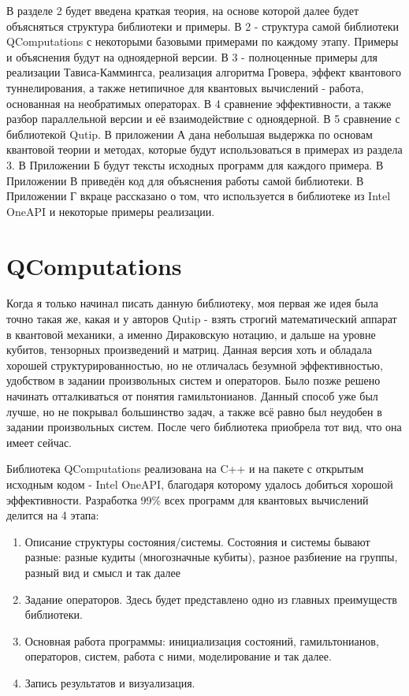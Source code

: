 \documentclass[aps,twocolumn,pra,showpacs,amsmath,amssymb,showkeys,10pt]{revtex4-2}
\begin{document}
          В разделе 2 будет введена краткая теория, на основе которой далее будет объясняться структура библиотеки и примеры. В 2 - структура самой библиотеки QComputations с некоторыми
          базовыми примерами по каждому этапу. Примеры и объяснения будут на одноядерной версии. В 3 - полноценные примеры для реализации Тависа-Каммингса, реализация алгоритма Гровера, эффект квантового туннелирования,
          а также нетипичное для квантовых вычислений - работа,
          основанная на необратимых операторах. В 4 сравнение эффективности, а также разбор параллельной версии и её взаимодействие с одноядерной. В 5 сравнение с библиотекой Qutip.
          В приложении А дана небольшая выдержка по основам квантовой теории и методах, которые будут использоваться в примерах из раздела 3. В Приложении Б будут тексты
          исходных программ для каждого примера. В Приложении В приведён код для объяснения работы самой библиотеки. В Приложении Г вкраце рассказано о том, что используется в библиотеке из Intel 
          OneAPI и некоторые примеры реализации.

    \section{QComputations}
    Когда я только начинал писать данную библиотеку, моя первая же идея была точно такая же, какая и у авторов Qutip - взять строгий математический аппарат в квантовой механики, а именно Дираковскую 
    нотацию, и дальше на уровне кубитов, тензорных произведений и матриц. Данная версия хоть и обладала хорошей структурированностью, но не отличалась безумной эффективностью, удобством в задании 
    произвольных систем и операторов. Было позже решено начинать отталкиваться от понятия гамильтонианов. Данный способ уже был лучше, но не покрывал большинство задач, а также всё равно был неудобен 
    в задании произвольных систем. После чего библиотека приобрела тот вид, что она имеет сейчас.

    Библиотека QComputations реализована на C++ и на пакете с открытым исходным кодом - Intel OneAPI, благодаря которому удалось добиться хорошой эффективности. 
    Разработка 99\% всех программ для квантовых вычислений делится на 4 этапа:
    \begin{enumerate}
    \item Описание структуры состояния/системы. Состояния и системы бывают разные: разные кудиты (многозначные кубиты), разное разбиение на группы, разный вид и смысл и так далее
    \item Задание операторов. Здесь будет представлено одно из главных преимуществ библиотеки.
    \item Основная работа программы: инициализация состояний, гамильтонианов, операторов, систем, работа с ними, моделирование и так далее.
    \item Запись результатов и визуализация.
    \end{enumerate}
    
\end{document}
